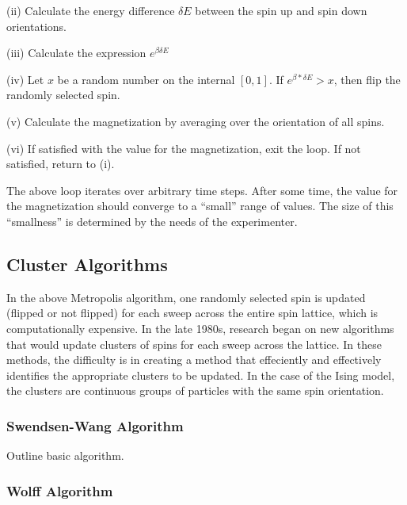 \documentclass[11pt,letterpaper,fleqn]{article}
\begin{document}
(ii) Calculate the energy difference $\delta E$ between the spin up and spin down orientations.
\newline

(iii) Calculate the expression $e^{\beta \delta E}$
\newline

(iv) Let $x$ be a random number on the internal $[0,1]$.  If $e^{\beta * \delta E} > x$, then flip 
the randomly selected spin.
\newline

(v) Calculate the magnetization by averaging over the orientation of all spins.
\newline

(vi) If satisfied with the value for the magnetization, exit the loop.  If not satisfied, return to (i).
\newline


The above loop iterates over arbitrary time steps.  After some time, the value for the magnetization should converge to a ``small'' 
range of values.  The size of this ``smallness'' is determined by the needs of the experimenter.


\subsection*{Cluster Algorithms}


In the above Metropolis algorithm, one randomly selected spin is updated (flipped or not flipped) for each sweep across the 
entire spin lattice, which is computationally expensive.
In the late 1980s, research began on new algorithms that would update clusters of spins for each sweep across the lattice.  
In these methods, the difficulty is in creating a method that effeciently and effectively
identifies the appropriate clusters to be updated.  In the case of the Ising model, the clusters are continuous groups
of particles with the same spin orientation.


\subsubsection*{Swendsen-Wang Algorithm}

Outline basic algorithm.


\subsubsection*{Wolff Algorithm}
\end{document}
